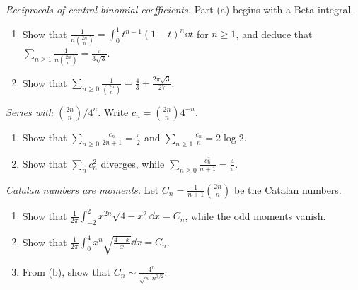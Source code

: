 \begin{exercise}[$\star\star$]\label{pb:centralsum}
\emph{Reciprocals of central binomial coefficients.} Part (a) begins with a Beta integral.
\begin{enumerate}[label=(\alph*)]
\item Show that $\displaystyle\frac1{n\binom{2n}n}=\int_0^1t^{n-1}(1-t)^n\dd t$ for $n\ge1$, and deduce that $\displaystyle\sum_{n\ge1}\frac1{n\binom{2n}n}=\frac\pi{3\sqrt3}$.
\item Show that $\displaystyle\sum_{n\ge0}\frac1{\binom{2n}n}=\frac43+\frac{2\pi\sqrt3}{27}$.
\end{enumerate}
\end{exercise}

\begin{exercise}[$\star$]\label{pb:lehmer}
\emph{Series with $\binom{2n}n/4^n$.} Write $c_n=\binom{2n}n4^{-n}$.
\begin{enumerate}[label=(\alph*)]
\item Show that $\displaystyle\sum_{n\ge0}\frac{c_n}{2n+1}=\frac\pi2$ and $\displaystyle\sum_{n\ge1}\frac{c_n}n=2\log2$.
\item Show that $\sum_nc_n^2$ diverges, while $\displaystyle\sum_{n\ge0}\frac{c_n^2}{n+1}=\frac4\pi$.
\end{enumerate}
\end{exercise}

\begin{exercise}[$\star\star$]\label{pb:catalanmoments}
\emph{Catalan numbers are moments.} Let $C_n=\frac1{n+1}\binom{2n}n$ be the Catalan numbers.
\begin{enumerate}[label=(\alph*)]
\item Show that $\displaystyle\frac1{2\pi}\int_{-2}^2x^{2n}\sqrt{4-x^2}\dd x=C_n$, while the odd moments vanish.
\item Show that $\displaystyle\frac1{2\pi}\int_0^4x^n\sqrt{\frac{4-x}x}\dd x=C_n$.
\item From (b), show that $C_n\sim\frac{4^n}{\sqrt\pi\,n^{3/2}}$.
\end{enumerate}
\end{exercise}

